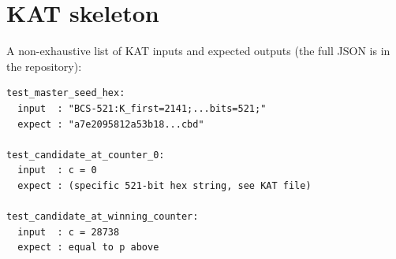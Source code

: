 \documentclass[11pt,a4paper]{article}
\theoremstyle{plain}
\theoremstyle{definition}
\begin{document}
\section{KAT skeleton}
\label{app:kats}

A non-exhaustive list of KAT inputs and expected outputs (the full
JSON is in the repository):
\begin{verbatim}
test_master_seed_hex:
  input  : "BCS-521:K_first=2141;...bits=521;"
  expect : "a7e2095812a53b18...cbd"

test_candidate_at_counter_0:
  input  : c = 0
  expect : (specific 521-bit hex string, see KAT file)

test_candidate_at_winning_counter:
  input  : c = 28738
  expect : equal to p above
\end{verbatim}



\end{document}
